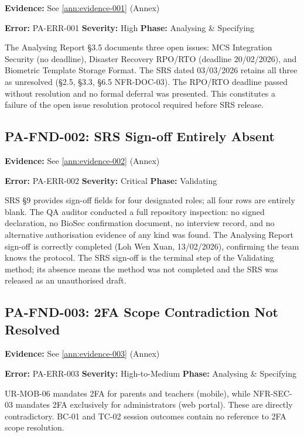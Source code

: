 \documentclass[11pt,a4paper]{article}
\begin{document}
\noindent\textbf{Evidence:} See \ref{ann:evidence-001} (Annex)

\noindent\textbf{Error:} PA-ERR-001 \quad \textbf{Severity:} High \quad \textbf{Phase:} Analysing \& Specifying 

The Analysing Report \S3.5 documents three open issues: MCS Integration Security (no deadline), Disaster Recovery RPO/RTO (deadline 20/02/2026), and Biometric Template Storage Format. The SRS dated 03/03/2026 retains all three as unresolved (\S2.5, \S3.3, \S6.5 NFR-DOC-03). The RPO/RTO deadline passed without resolution and no formal deferral was presented. This constitutes a failure of the open issue resolution protocol required before SRS release.

\subsection{PA-FND-002: SRS Sign-off Entirely Absent}

\noindent\textbf{Evidence:} See \ref{ann:evidence-002} (Annex)

\noindent\textbf{Error:} PA-ERR-002 \quad \textbf{Severity:} Critical \quad \textbf{Phase:} Validating

SRS \S9 provides sign-off fields for four designated roles; all four rows are entirely blank. The QA auditor conducted a full repository inspection: no signed declaration, no BioSec confirmation document, no interview record, and no alternative authorisation evidence of any kind was found. The Analysing Report sign-off is correctly completed (Loh Wen Xuan, 13/02/2026), confirming the team knows the protocol. The SRS sign-off is the terminal step of the Validating method; its absence means the method was not completed and the SRS was released as an unauthorised draft.

\subsection{PA-FND-003: 2FA Scope Contradiction Not Resolved}

\noindent\textbf{Evidence:} See \ref{ann:evidence-003} (Annex)

\noindent\textbf{Error:} PA-ERR-003 \quad \textbf{Severity:} High-to-Medium \quad \textbf{Phase:} Analysing \& Specifying

UR-MOB-06 mandates 2FA for parents and teachers (mobile), while NFR-SEC-03 mandates 2FA exclusively for administrators (web portal). These are directly contradictory. BC-01 and TC-02 session outcomes contain no reference to 2FA scope resolution.
\end{document}
